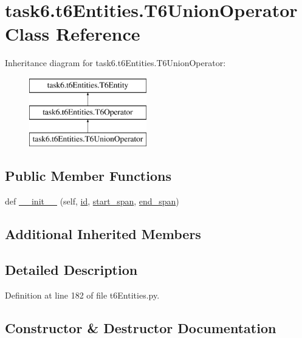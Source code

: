 \hypertarget{classtask6_1_1t6Entities_1_1T6UnionOperator}{}\section{task6.\+t6\+Entities.\+T6\+Union\+Operator Class Reference}
\label{classtask6_1_1t6Entities_1_1T6UnionOperator}
Inheritance diagram for task6.\+t6\+Entities.\+T6\+Union\+Operator\+:\begin{figure}[H]
\begin{center}
\leavevmode
\includegraphics[height=3.000000cm]{classtask6_1_1t6Entities_1_1T6UnionOperator}
\end{center}
\end{figure}
\subsection*{Public Member Functions}
\begin{DoxyCompactItemize}
\item 
def \hyperlink{classtask6_1_1t6Entities_1_1T6UnionOperator_a781a17ffc6d31ec14fecfb2c09e63613}{\+\_\+\+\_\+init\+\_\+\+\_\+} (self, \hyperlink{classtask6_1_1t6Entities_1_1T6Entity_afeeced8134bb3ebe0cfecc64d0ab46a4}{id}, \hyperlink{classtask6_1_1t6Entities_1_1T6Entity_a52779e9af8864dc98e8b02fc5b9b041a}{start\+\_\+span}, \hyperlink{classtask6_1_1t6Entities_1_1T6Entity_aeb402200b156cd9562c5111dfe777b98}{end\+\_\+span})
\end{DoxyCompactItemize}
\subsection*{Additional Inherited Members}


\subsection{Detailed Description}


Definition at line 182 of file t6\+Entities.\+py.



\subsection{Constructor \& Destructor Documentation}
\mbox{\label{classtask6_1_1t6Entities_1_1T6UnionOperator_a781a17ffc6d31ec14fecfb2c09e63613}} 
